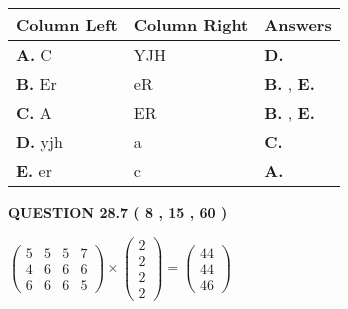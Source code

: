 \documentclass[12pt]{article}
\begin{document}
  
\begin{tabular}{|l|l|l|}
 \hline
 Column Left & Column Right  & Answers       \\ 
 \hline
{\textbf{\large{
A.}}}
C
  & 
YJH
 & 
{\textbf{\large{
D.}}}
 \\ 
 \hline
{\textbf{\large{
B.}}}
Er
  & 
eR
 & 
{\textbf{\large{
B.}}}
, 
{\textbf{\large{
E.}}}
 \\ 
 \hline
{\textbf{\large{
C.}}}
A
  & 
ER
 & 
{\textbf{\large{
B.}}}
, 
{\textbf{\large{
E.}}}
 \\ 
 \hline
{\textbf{\large{
D.}}}
yjh
  & 
a
 & 
{\textbf{\large{
C.}}}
 \\ 
 \hline
{\textbf{\large{
E.}}}
er
  & 
c
 & 
{\textbf{\large{
A.}}}
 \\ 
 \hline
 \end{tabular}
  
  
 
 
 
 
  
\vspace{0.2in}
  
{\textbf{\Large{QUESTION
28.7 
 (           8 ,          15 ,          60 )
}}}
  
  
 
 
\noindent{}

 
$\left( \begin{array}{ccccccccccccccc}
           5  & 
           5  & 
           5  & 
           7  \\ 
           4  & 
           6  & 
           6  & 
           6  \\ 
           6  & 
           6  & 
           6  & 
           5
\end{array}\right) \times
\left( \begin{array}{c}
           2  \\ 
           2  \\ 
           2  \\ 
           2
\end{array}\right)  =
\left( \begin{array}{c}
          44  \\ 
          44  \\ 
          46
\end{array}\right)  $
 
\end{document}
